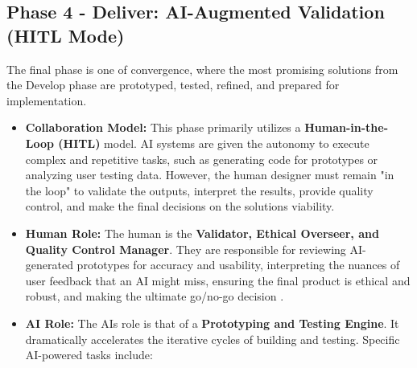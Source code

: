 \documentclass[
  12pt,
  a4paper,
  bibliography=totoc,
  numbers=noenddot
]{scrartcl}
\begin{document}
\subsection{Phase 4 - Deliver:
AI-Augmented Validation (HITL
Mode)}\label{phase-4---deliver-ai-augmented-validation-hitl-mode}

The final phase is one of convergence, where the most promising
solutions from the Develop phase are prototyped, tested, refined, and
prepared for implementation.

\begin{itemize}
\item
  \textbf{Collaboration Model:} This phase primarily utilizes a
  \textbf{Human-in-the-Loop (HITL)} model. AI systems are given the
  autonomy to execute complex and repetitive tasks, such as generating
  code for prototypes or analyzing user testing data. However, the human
  designer must remain "in the loop" to validate the outputs, interpret
  the results, provide quality control, and make the final decisions on
  the solution\textquotesingle s viability.
\item
  \textbf{Human Role:} The human is the \textbf{Validator, Ethical
  Overseer, and Quality Control Manager}. They are responsible for
  reviewing AI-generated prototypes for accuracy and usability,
  interpreting the nuances of user feedback that an AI might miss,
  ensuring the final product is ethical and robust, and making the
  ultimate go/no-go decision \cite{uxdesign2025why}.
\item
  \textbf{AI Role:} The AI\textquotesingle s role is that of a
  \textbf{Prototyping and Testing Engine}. It dramatically accelerates
  the iterative cycles of building and testing. Specific AI-powered
  tasks include:


\end{itemize}
\end{document}
